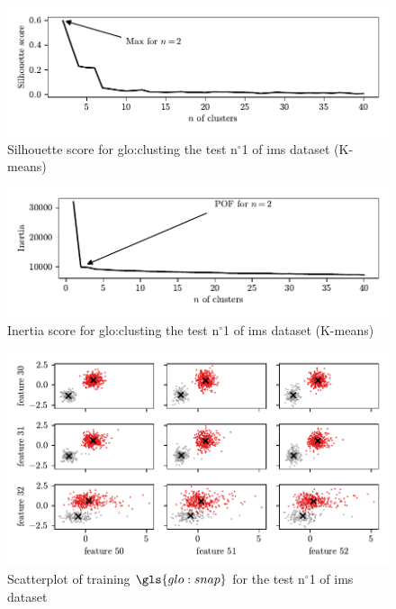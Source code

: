 \begin{figure}
    \centering
    \includegraphics{images/IMS/SilScore_01.pdf}
    \caption{Silhouette score for \gls{glo:clust}ing the test $\text{n}^\circ$1 of \gls{ims} dataset (K-means)}
    \label{fig:SilScore_01}
\end{figure}

\begin{figure}
    \centering
    \includegraphics{images/IMS/InertiaScore_01.pdf}
    \caption{Inertia score for \gls{glo:clust}ing the test $\text{n}^\circ$1 of \gls{ims} dataset (K-means)}
    \label{fig:InertiaScore_01}
\end{figure}

\begin{figure}
    \centering
    \includegraphics{images/IMS/Clusters.pdf}
    \caption{Scatterplot of training $\gls{glo:snap}$ for the test $\text{n}^\circ$1 of \gls{ims} dataset}
    \label{fig:Clusters}
\end{figure}

